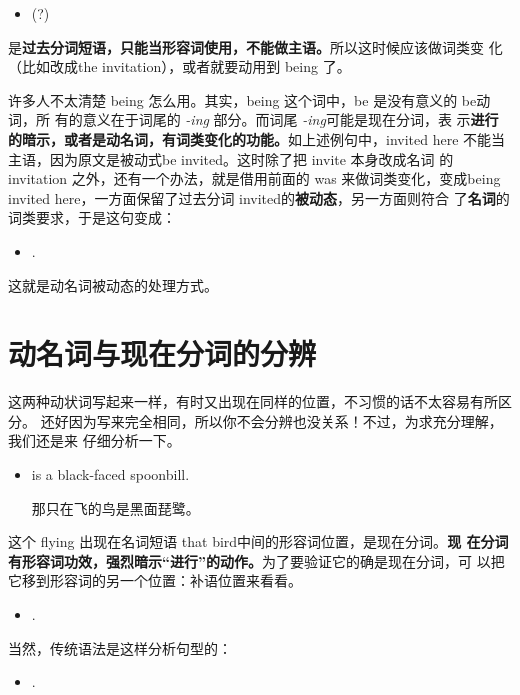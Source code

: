 \begin{itemize}
\item {} (?)
\end{itemize}
是\textbf{过去分词短语，只能当形容词使用，不能做主语。}所以这时候应该做词类变
化（比如改成the invitation），或者就要动用到 being 了。

许多人不太清楚 being 怎么用。其实，being 这个词中，be 是没有意义的 be动词，所
有的意义在于词尾的 \emph{-ing} 部分。而词尾 \emph{-ing}可能是现在分词，表
示\textbf{进行的暗示，或者是动名词，有词类变化的功能。}如上述例句中，invited
here 不能当主语，因为原文是被动式be invited。这时除了把 invite 本身改成名词
的invitation 之外，还有一个办法，就是借用前面的 was 来做词类变化，变成being
invited here，一方面保留了过去分词 invited的\textbf{被动态}，另一方面则符合
了\textbf{名词}的词类要求，于是这句变成：
\begin{itemize}
\item {}  .
\end{itemize}

这就是动名词被动态的处理方式。

\section{动名词与现在分词的分辨}

这两种动状词写起来一样，有时又出现在同样的位置，不习惯的话不太容易有所区分。
还好因为写来完全相同，所以你不会分辨也没关系！不过，为求充分理解，我们还是来
仔细分析一下。

\begin{itemize}
\item {} is a black-faced spoonbill.

  那只在飞的鸟是黑面琵鹭。
\end{itemize}

这个 flying 出现在名词短语 that bird中间的形容词位置，是现在分词。\textbf{现
  在分词有形容词功效，强烈暗示“进行”的动作。}为了要验证它的确是现在分词，可
以把它移到形容词的另一个位置：补语位置来看看。

\begin{itemize}
\item  {}  .
\end{itemize}

当然，传统语法是这样分析句型的：

\begin{itemize}
\item  {} .
\end{itemize}


